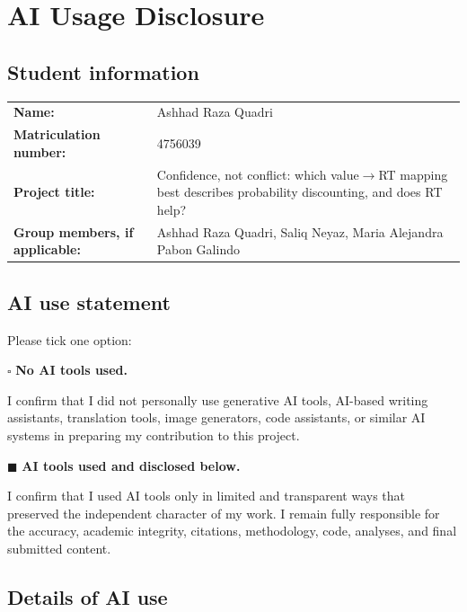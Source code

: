 \documentclass[11pt]{article}
\begin{document}
\section*{AI Usage Disclosure}

\subsection*{Student information}

\begin{tabularx}{\textwidth}{>{\bfseries}l X}
Name: & Ashhad Raza Quadri \\[0.6em]
Matriculation number: & 4756039 \\[0.6em]
Project title: & Confidence, not conflict: which value$\to$RT mapping best describes probability discounting, and does RT help? \\[0.6em]
Group members, if applicable: & Ashhad Raza Quadri, Saliq Neyaz, Maria Alejandra Pabon Galindo \\
\end{tabularx}

\bigskip

\subsection*{AI use statement}

Please tick one option:

\medskip

\noindent
$\square$ \textbf{No AI tools used.}

\noindent
I confirm that I did not personally use generative AI tools, AI-based writing
assistants, translation tools, image generators, code assistants, or similar AI
systems in preparing my contribution to this project.

\medskip

\noindent
$\blacksquare$ \textbf{AI tools used and disclosed below.}

\noindent
I confirm that I used AI tools only in limited and transparent ways that preserved
the independent character of my work. I remain fully responsible for the accuracy,
academic integrity, citations, methodology, code, analyses, and final submitted
content.

\bigskip

\subsection*{Details of AI use}
\end{document}
